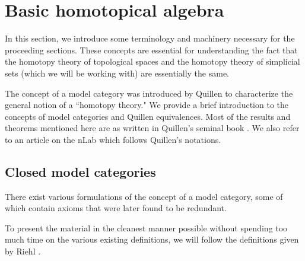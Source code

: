\documentclass[12pt]{report}
\numberwithin{equation}{section}
\begin{document}
	
	

	
	\chapter{Basic homotopical algebra}
	In this section, we introduce some terminology and machinery necessary for the proceeding sections. These concepts are essential for understanding the fact that the homotopy theory of topological spaces and the homotopy theory of simplicial sets (which we will be working with) are essentially the same.

	The concept of a model category was introduced by Quillen to characterize the general notion of a ``homotopy theory." We provide a brief introduction to the concepts of model categories and Quillen equivalences. Most of the results and theorems mentioned here are as written in Quillen's seminal book \cite{quillen1967homotopical}. We also refer to an article on the nLab \cite{nlab:introduction_to_homotopy_theory} which follows Quillen's notations.
	 
	 
	\section{Closed model categories}
	There exist various formulations of the concept of a model category, some of which contain axioms that were later found to be redundant.
	
	To present the material in the cleanest manner possible without spending too much time on the various existing definitions, we will follow the definitions given by Riehl \cite{riehlmodelcat}.
	
\end{document}
